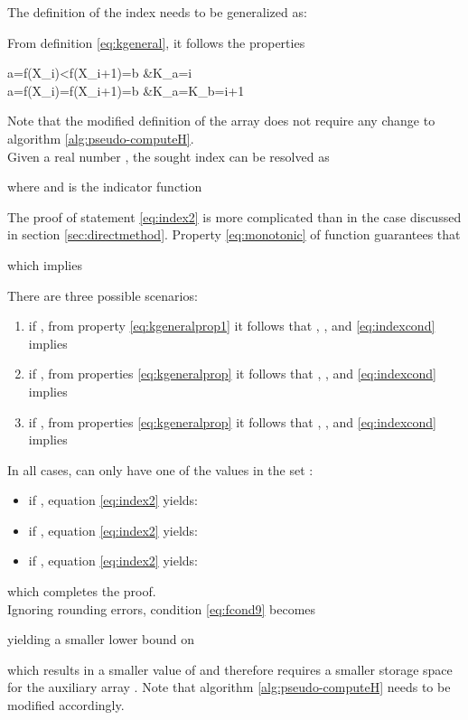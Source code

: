 \documentclass[preprint,1p,times]{elsarticle}
\begin{document}
The definition of the index  needs to be generalized as:

From definition \eqref{eq:kgeneral}, it follows the properties

\label{eq:kgeneralprop1}
    a=f(X_{i})<f(X_{i+1})=b &\implies K_a=i \\
\label{eq:kgeneralprop2}    
    a=f(X_{i})=f(X_{i+1})=b &\implies K_a=K_b=i+1

Note that the modified definition of the array  does not require any change to algorithm \eqref{alg:pseudo-computeH}. \\

Given a real number , the sought index  can be resolved as

where  and  is the indicator function

The proof of statement \eqref{eq:index2} is more complicated than in the case discussed in section \ref{sec:directmethod}.
Property \eqref{eq:monotonic} of function  guarantees that

which implies

There are three possible scenarios:
\begin{enumerate}
	\item if , from property \eqref{eq:kgeneralprop1} it follows that , , and \eqref{eq:indexcond} implies 
	\item if , from properties \eqref{eq:kgeneralprop} it follows that , , and \eqref{eq:indexcond} implies 
	\item if , from properties \eqref{eq:kgeneralprop} it follows that , , and \eqref{eq:indexcond} implies 
\end{enumerate}
In all cases,  can only have one of the values in the set :
\begin{itemize}
	\item if , equation \eqref{eq:index2} yields: 
	\item if , equation \eqref{eq:index2} yields: 
	\item if , equation \eqref{eq:index2} yields: 
\end{itemize}
which completes the proof. \\

Ignoring rounding errors, condition \eqref{eq:fcond9} becomes

yielding a smaller lower bound on 

which results in a smaller value of  and therefore requires a smaller storage space for the auxiliary array . Note that algorithm \ref{alg:pseudo-computeH} needs to be modified accordingly. \\
\end{document}
